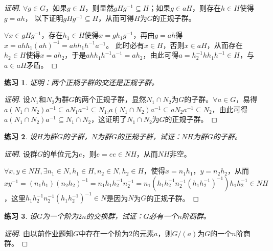 \documentclass{article}
\newtheorem{Exercise}{练习}
\begin{document}
\begin{CJK*}{UTF8}{gbsn}
\begin{proof}[证明]
  $\forall g\in G$，如果$g\in H$，则显然$gHg^{-1}\subseteq H$；如果$g\in aH$，则存在$h\in H$使得$g=ah$，
  以下证明$gHg^{-1}\subseteq H$，从而可得$H$为$G$的正规子群。

  $\forall x\in gHg^{-1}$，存在$h_1\in H$使得$x=gh_1g^{-1}$，再由$g=ah$得$x=ahh_1(ah)^{-1}=ahh_1h^{-1}a^{-1}$。
  此时必有$x\in H$，否则$x\in aH$，从而存在$h_2\in H$使得$x=ah_2$，于是$ahh_1h^{-1}a^{-1}=ah_2$，由此可得$a=h_2^{-1}hh_1h^{-1}\in H$，与$a\in aH$矛盾。
\end{proof}
\begin{Exercise}
证明：两个正规子群的交还是正规子群。
\end{Exercise}
\begin{proof}[证明]
  设$N_1$和$N_2$为群$G$的两个正规子群，显然$N_1\cap N_2$为$G$的子群。$\forall a\in G$，易得$a(N_1\cap N_2)a^{-1}\subseteq aN_1a^{-1}\subseteq N_1$,$a(N_1\cap N_2)a^{-1}\subseteq aN_2a^{-1}\subseteq N_2$，由此可得$a(N_1\cap N_2)a^{-1}\subseteq N_1\cap N_2$，这证明了$N_1\cap N_2$为$G$的正规子群。
\end{proof}
\begin{Exercise}
设$H$为群$G$的子群，$N$为群$G$的正规子群，试证：$NH$为群$G$的子群。
\end{Exercise}
\begin{proof}[证明]
  设群$G$的单位元为$e$，则$e=ee\in NH$，从而$NH$非空。

  $\forall x,y \in NH, \exists n_1\in N,h_1\in H,n_2\in N,h_2\in H$，使得$x=n_1h_1$，$y=n_2h_2$，从而
  $xy^{-1}=(n_1h_1)(n_2h_2)^{-1}=n_1h_1h_2^{-1}n_2^{-1}=n_1(h_1h_2^{-1}n_2^{-1}(h_1h_2^{-1})^{-1})h_1h_2^{-1}\in NH$，这里$h_1h_2^{-1}n_2^{-1}(h_1h_2^{-1})^{-1}\in N$是因为$N$为$G$的正规子群。
\end{proof}


\begin{Exercise}
设$G$为一个阶为$2n$的交换群，试证：$G$必有一个$n$阶商群。
\end{Exercise}
\begin{proof}[证明]
  由以前作业题知$G$中存在一个阶为$2$的元素$a$，则$G/(a)$为$G$的一个$n$阶商群。
\end{proof}



\end{CJK*}
\end{document}
